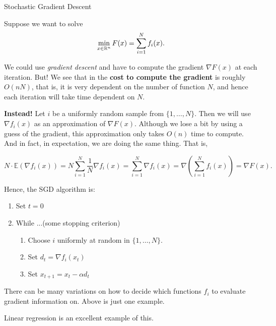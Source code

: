 \begin{general}{Stochastic Gradient Descent}{}

Suppose we want to solve
\begin{equation}
\min_{x \in {\mathbb{R}}^n} F(x) = \sum_{i=1}^N f_i(x).
\end{equation}

We could use \emph{gradient descent} and have to compute the gradient $\nabla F(x)$ at each iteration.  But!   We see that in the \textbf{cost to compute the gradient} is roughly $O(nN)$, that is, it is very dependent on the number of function $N$, and hence each iteration will take time dependent on $N$.

\textbf{Instead!} Let $i$ be a uniformly random sample from $\{1, \dots, N\}$.  Then we will use $\nabla f_i(x)$ as an approximation of $\nabla F(x)$.  Although we lose a bit by using a guess of the gradient, this approximation only takes $O(n)$ time to compute.  And in fact, in expectation, we are doing the same thing.  That is,

$$
N\cdot  \mathbb{E}( \nabla f_i(x)) = N \sum_{i=1}^N \frac{1}{N} \nabla f_i(x) =  \sum_{i=1}^N\nabla f_i(x) = \nabla \left(  \sum_{i=1}^N   f_i(x)\right) = \nabla F(x).
$$


Hence, the SGD algorithm is:

\begin{enumerate}
\item Set $t = 0$
\item While ...(some stopping criterion)
\begin{enumerate}
\item Choose $i$ uniformly at random in $\{1, \dots, N\}$.
\item Set $d_t = \nabla f_i(x_t)$
\item Set $x_{t+1} = x_t - \alpha d_t$
\end{enumerate}
\end{enumerate}

There can be many variations on how to decide which functions $f_i$ to evaluate gradient information on.  Above is just one example.

\end{general}
 
 
 
 Linear regression is an excellent example of this.  

